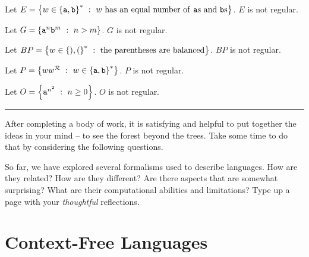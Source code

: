 \documentclass[twoside,letterpaper,openany]{book}
\begin{document}
\begin{thm}
Let $E = \left\lbrace w \in \left\lbrace {\texttt{a}}, {\texttt{b}} \right\rbrace^{*}\ :\ w~\textrm{has an equal number of {\texttt{a}}{s} and {\texttt{b}}{s}} \right\rbrace$. $E$ is not regular.
\end{thm}

\begin{thm}
Let $G = \left\lbrace {\texttt{a}}^n {\texttt{b}}^m\ :\ n > m \right\rbrace$. $G$ is not regular.
\end{thm}

\begin{thm}
Let $BP = \left\lbrace w \in \left\lbrace ), ( \right\rbrace^{*}\ :\ \textrm{the parentheses are balanced} \right\rbrace$. $BP$ is not regular.
\end{thm}


\begin{thm}
Let $P = \left\lbrace ww^{\mathcal{R}}\ :\ w \in \left\lbrace {\texttt{a}}, {\texttt{b}} \right\rbrace^{*} \right\rbrace$. $P$ is not regular.
\end{thm}

\begin{thm}
Let $O = \left\lbrace {\texttt{a}}^{n^2}\ :\ n \geq 0 \right\rbrace$. $O$ is not regular.
\end{thm}


\vspace{.3in}
\hrule 
\vspace{.3in}

\begin{discussion}
After completing a body of work, it is satisfying and helpful to put together the ideas in your mind -- to see the forest beyond the trees. Take some time to do that by considering the following questions.
\end{discussion}

\begin{exer}
So far, we have explored several formalisms used to describe languages. How are they related? How are they different? Are there aspects that are somewhat surprising? What are their computational abilities and limitations? Type up a page with your \emph{thoughtful} reflections.
\end{exer}



\chapter{Context-Free Languages}
\end{document}
